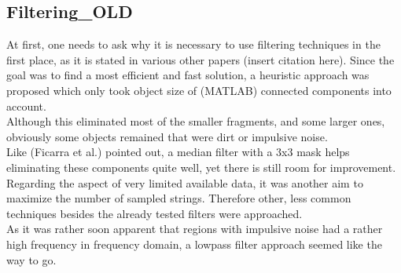 \documentclass{article}
\begin{document}
\subsection{Filtering_OLD}\label{sec:Filtering}
At first, one needs to ask why it is necessary to use filtering techniques in the first place, as it is stated in various other papers (insert citation here). Since the goal was to find a most efficient and fast solution, a heuristic approach was proposed which only took object size of (MATLAB) connected components into account.\\
Although this eliminated most of the smaller fragments, and some larger ones, obviously some objects remained that were dirt or impulsive noise. \\
Like (Ficarra et al.) pointed out, a median filter with a 3x3 mask helps eliminating these components quite well, yet there is still room for improvement. Regarding the aspect of very limited available data, it was another aim to maximize the number of sampled strings. Therefore other, less common techniques besides the already tested filters were approached.\\
As it was rather soon apparent that regions with impulsive noise had a rather high frequency in frequency domain, a lowpass filter approach seemed like the way to go.

\end{document}
